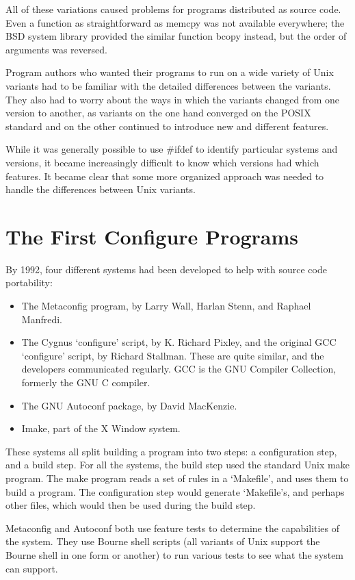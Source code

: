 All of these variations caused problems for programs distributed as source code. Even a function as straightforward as memcpy was not available everywhere; the BSD system library provided the similar function bcopy instead, but the order of arguments was reversed. 


Program authors who wanted their programs to run on a wide variety of Unix variants had to be familiar with the detailed differences between the variants. They also had to worry about the ways in which the variants changed from one version to another, as variants on the one hand converged on the POSIX standard and on the other continued to introduce new and different features. 


While it was generally possible to use \#ifdef to identify particular systems and versions, it became increasingly difficult to know which versions had which features. It became clear that some more organized approach was needed to handle the differences between Unix variants. 

\section{The First Configure Programs}
By 1992, four different systems had been developed to help with source code portability: 

\begin{itemize}
\item The Metaconfig program, by Larry Wall, Harlan Stenn, and Raphael Manfredi. 
\item The Cygnus `configure' script, by K. Richard Pixley, and the original GCC `configure' script, by Richard Stallman. These are quite similar, and the developers communicated regularly. GCC is the GNU Compiler Collection, formerly the GNU C compiler. 
\item The GNU Autoconf package, by David MacKenzie. 
\item Imake, part of the X Window system. 
\end{itemize}

These systems all split building a program into two steps: a configuration step, and a build step. For all the systems, the build step used the standard Unix make program. The make program reads a set of rules in a `Makefile', and uses them to build a program. The configuration step would generate `Makefile's, and perhaps other files, which would then be used during the build step. 


Metaconfig and Autoconf both use feature tests to determine the capabilities of the system. They use Bourne shell scripts (all variants of Unix support the Bourne shell in one form or another) to run various tests to see what the system can support. 


